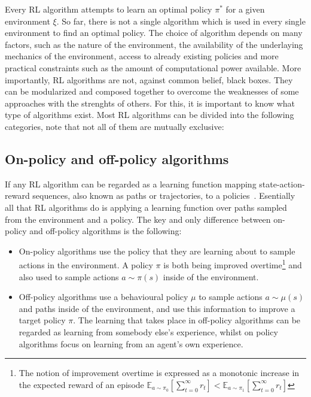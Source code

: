 \documentclass{../main.tex}{}
\begin{document}


Every RL algorithm attempts to learn an optimal policy $\pi^*$ for a given environment $\xi$. So far, there is not a single algorithm which is used in every single environment to find an optimal policy. The choice of algorithm depends on many factors, such as the nature of the environment, the availability of the underlaying mechanics of the environment, access to already existing policies and more practical constraints such as the amount of computational power available. More importantly, RL algorithms are not, against common belief, black boxes. They can be modularized and composed together to overcome the weaknesses of some approaches with the strenghts of others. For this, it is important to know what type of algorithms exist. Most RL algorithms can be divided into the following categories, note that not all of them are mutually exclusive:

\subsection{On-policy and off-policy algorithms}

If any RL algorithm can be regarded as a learning function mapping state-action-reward sequences, also known as paths or trajectories, to a policies~\citep{Laurent2011}. Esentially all that RL algorithms do is applying a learning function over paths sampled from the environment and a policy. The key and only difference between on-policy and off-policy algorithms is the following:
\begin{itemize}
    \item On-policy algorithms use the policy that they are learning about to sample actions in the environment. A policy $\pi$ is both being improved overtime\footnote{The notion of improvement overtime is expressed as a monotonic increase in the expected reward of an episode $\mathbb{E}_{a \sim \pi_0}[\sum_{t=0}^{\infty}r_t] < \mathbb{E}_{a \sim \pi_1}[\sum_{t=0}^{\infty}r_t]$} and also used to sample actions $a \sim \pi(s)$ inside of the environment.
    \item Off-policy algorithms use a behavioural policy $\mu$ to sample actions $a \sim \mu(s)$ and paths inside of the environment, and use this information to improve a target policy $\pi$. The learning that takes place in off-policy algorithms can be regarded as learning from somebody else's experience, whilst on policy algorithms focus on learning from an agent's own experience.
\end{itemize}
\end{document}
